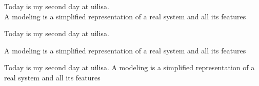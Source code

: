 \documentclass[12pt]{report}
\begin{document}
	Today is my second day at uilisa.\\
	A modeling is a simplified representation of a real system and all its features
	
	Today is my second day at uilisa.
	
	A modeling is a simplified representation of a real system and all its features 


Today is my second day at uilisa.\newline
A modeling is a simplified representation of a real system and all its features
\end{document}
